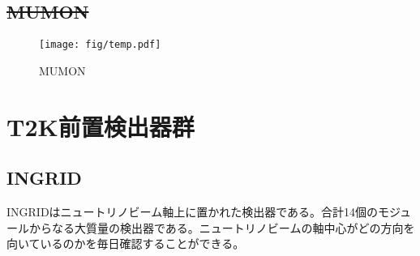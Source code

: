 
%



\subsection{\sout{MUMON}}

\begin{figure}[htb]
\begin{center}
\texttt{[image: fig/temp.pdf]}
\caption[MUMON]{MUMON}
\label{MUMON}
\end{center}
\end{figure}

\fi %

\section{T2K前置検出器群}
\subsection{INGRID}
INGRIDはニュートリノビーム軸上に置かれた検出器である。合計14個のモジュールからなる大質量の検出器である。ニュートリノビームの軸中心がどの方向を向いているのかを毎日確認することができる。


